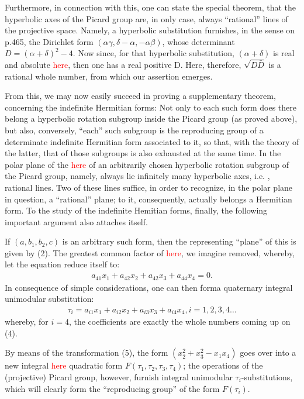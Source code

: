 Furthermore, in connection with this, one can state the special theorem, that the hyperbolic axes of the Picard group are, in only case, always “rational” lines of the projective space. Namely, a hyperbolic substitution furnishes, in the sense on p.465, the Dirichlet form $(\alpha\gamma,\delta-\alpha,-\alpha\beta)$, whose determinant $D=(\alpha+\delta)^2-4$. Now since, for that hyperbolic substitution, $(\alpha+\delta)$ is real and absolute \textcolor{red}{here}, then one has a real positive D. Here, therefore, $\sqrt{D\bar{D}}$ is a rational whole number, from which our assertion emerges.

From this, we may now easily succeed in proving a supplementary theorem, concerning the indefinite Hermitian forms: Not only to each such form does there belong a hyperbolic rotation subgroup inside the Picard group (as proved above), but also, conversely, “each” such subgroup is the reproducing group of a determinate indefinite Hermitian form associated to it, so that, with the theory of the latter, that of those subgroups is also exhausted at the same time. In the polar plane of the \textcolor{red}{here} of an arbitrarily chosen hyperbolic rotation subgroup of the Picard group, namely, always lie infinitely many hyperbolic axes, i.e. , rational lines. Two of these lines suffice, in order to recognize, in the polar plane in question, a “rational” plane; to it, consequently, actually belongs a Hermitian form.
To the study of the indefinite Hemitian forms, finally, the following important argument also attaches itself.

If $(a,b_1,b_2,c)$ is an arbitrary such form, then the representing “plane” of this is given by (2). The greatest common factor of \textcolor{red}{here}, we imagine removed, whereby, let the equation reduce itself to:
\begin{align}
a_{41}x_1+a_{42}x_2+a_{42}x_3+a_{44}x_4=0.
\end{align}
In consequence of simple considerations, one can then forma quaternary integral unimodular substitution:
\begin{align}
\tau_i=a_{i1}x_1+a_{i2}x_2+a_{i3}x_3+a_{i4}x_4, i=1,2,3,4\ldots
\end{align}
whereby, for $i=4$, the coefficients are exactly the whole numbers coming up on (4).

By means of the transformation (5), the form $(x_2^2+x_3^2-x_1x_4)$ goes over into a new integral \textcolor{red}{here} quadratic form $F(\tau_1,\tau_2,\tau_3,\tau_4)$; the operations of the (projective) Picard group, however, furnish integral unimodular $\tau_i$-substitutions, which will clearly form the “reproducing group” of the form $F(\tau_i)$.

